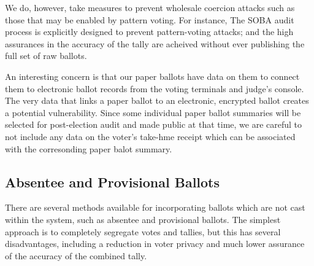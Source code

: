 We do, however, take measures to prevent wholesale coercion attacks such as those that may be enabled by pattern voting.  For instance, The SOBA audit process is explicitly designed to prevent pattern-voting attacks; and the high assurances in the accuracy of the tally are acheived without ever publishing the full set of raw ballots.


An interesting concern is that our paper ballots have data on them to connect them to electronic ballot records from the voting terminals and judge's console. The very data that links a paper ballot to an electronic, encrypted ballot creates a potential vulnerability. Since some individual paper ballot summaries will be selected for post-election audit and made public at that time, we are careful to not include any data on the voter's take-hme receipt which can be associated with the corresonding paper balot summary.




\subsection{Absentee and Provisional Ballots}
There are several methods available for incorporating ballots which are not cast within the \projname system, such as absentee and provisional ballots.  The simplest approach is to completely segregate votes and tallies, but this has several disadvantages, including a reduction in voter privacy and much lower assurance of the accuracy of the combined tally.

